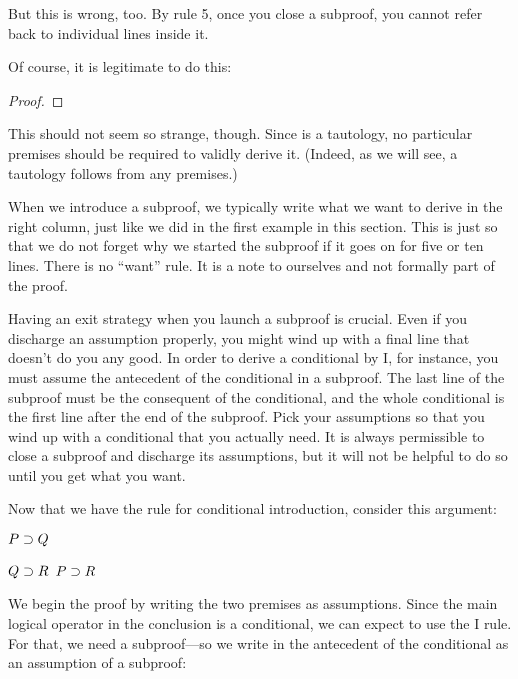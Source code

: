 But this is wrong, too. By rule 5, once you close a subproof, you cannot refer back to individual lines inside it.

Of course, it is legitimate to do this:

\begin{proof}
	\open
		 
	\close
	 
\end{proof}

This should not seem so strange, though. Since \eif{} is a tautology, no particular premises should be required to validly derive it. (Indeed, as we will see, a tautology follows from any premises.)

When we introduce a subproof, we typically write what we want to derive in the right column, just like we did in the first example in this section. This is just so that we do not forget why we started the subproof if it goes on for five or ten lines. There is no ``want'' rule. It is a note to ourselves and not formally part of the proof.

Having an exit strategy when you launch a subproof is crucial. Even if you discharge an assumption properly, you might wind up with a final line that doesn't do you any good. In order to derive a conditional by {\eif}I, for instance, you must assume the antecedent of the conditional in a subproof. The last line of the subproof must be the consequent of the conditional, and the whole conditional is the first line after the end of the subproof. Pick your assumptions so that you wind up with a conditional that you actually need. It is always permissible to close a subproof and discharge its assumptions, but it will not be helpful to do so until you get what you want.


Now that we have the rule for conditional introduction, consider this argument:
\label{proofHS}
\begin{earg*}
\item $P \supset Q$
\item $Q \supset R$
\itemc[.15] $P \supset R$
\end{earg*}
We begin the proof by writing the two premises as assumptions. Since the main logical operator in the conclusion is a conditional, we can expect to use the {\eif}I rule. For that, we need a subproof---so we write in the antecedent of the conditional as an assumption of a subproof:

